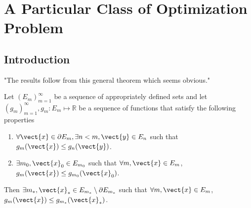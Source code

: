 \chapter{A Particular Class of Optimization Problem}
\label{Ch:StatOptim}


\section{Introduction}

"The results follow from this general theorem which seems obvious."

\begin{theorem}
	Let $(E_m)_{m=1}^\infty$ be a sequence of appropriately defined sets and let
	$(g_m)_{m=1}^\infty, g_m: E_m \mapsto \mathbb{R}$ be a sequence of
	functions that satisfy the following properties
	\begin{enumerate}
		\item $\forall \vect{x} \in \partial E_m, \exists n < m, \vect{y} \in E_n$ such that
		$g_m(\vect{x}) \leq g_n(\vect{y})$.
		\label{prop:one}
		\item $\exists m_0, \vect{x}_0 \in E_{m_0}$ such that $\forall m, \vect{x} \in 
		E_m$, $g_m(\vect{x}) \leq g_{m_0}(\vect{x}_0)$.
	\end{enumerate}
	Then $\exists m_*, \vect{x}_* \in E_{m_*} \setminus \partial E_{m_*}$ such
	that $\forall m, \vect{x} \in E_m$, $g_m(\vect{x}) \leq g_{m_*}(\vect{x}_*)$.
\end{theorem}




